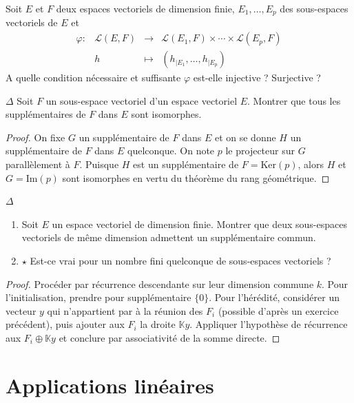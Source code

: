 \documentclass[french,a4paper]{article}
\newcommand{\K}{\mathbb{K}}
\renewcommand{\ker}{\text{Ker}}
\newcommand{\im}{\text{Im}}
\theoremstyle{plain}
\theoremstyle{definition}
\theoremstyle{remark}
\begin{document}
\begin{ex}[Moulin.29]{}
	Soit $E$ et $F$ deux espaces vectoriels de dimension finie, $E_1,\ldots,E_p$ des sous-espaces vectoriels de $E$ et $$\begin{array}{lrcl}
		\varphi:&\mathcal{L}(E,F)&\longrightarrow&\mathcal{L}(E_1,F)\times\cdots\times\mathcal{L}(E_p,F) \\
		&h&\longmapsto&(h_{\mid E_1},\ldots,h_{\mid E_p})
	\end{array}$$ A quelle condition nécessaire et suffisante $\varphi$ est-elle injective ? Surjective ?
\end{ex}

\begin{ex}[Moulin.30]{$\Delta$}
	Soit $F$ un sous-espace vectoriel d'un espace vectoriel $E$. Montrer que tous les supplémentaires de $F$ dans $E$ sont isomorphes.
\end{ex}
\begin{proof}
	On fixe $G$ un supplémentaire de $F$ dans $E$ et on se donne $H$ un supplémentaire de $F$ dans $E$ quelconque. On note $p$ le projecteur sur $G$ parallèlement à $F$. Puisque $H$ est un supplémentaire de $F=\ker(p)$, alors $H$ et $G=\im(p)$ sont isomorphes en vertu du théorème du rang géométrique.
\end{proof}

\begin{ex}[Moulin.31]{$\Delta$}
	\begin{enumerate}
		\item Soit $E$ un espace vectoriel de dimension finie. Montrer que deux sous-espaces vectoriels de même dimension admettent un supplémentaire commun.
		\item $\star$ Est-ce vrai pour un nombre fini quelconque de sous-espaces vectoriels ?
	\end{enumerate}
\end{ex}
\begin{proof}
	Procéder par récurrence descendante sur leur dimension commune $k$. Pour l'initialisation, prendre pour supplémentaire $\{0\}$. Pour l'hérédité, considérer un vecteur $y$ qui n'appartient par à la réunion des $F_i$ (possible d'après un exercice précédent), puis ajouter aux $F_i$ la droite $\K y$. Appliquer l'hypothèse de récurrence aux $F_i\oplus\K y$ et conclure par associativité de la somme directe.
\end{proof}

\section{Applications linéaires}
\end{document}
